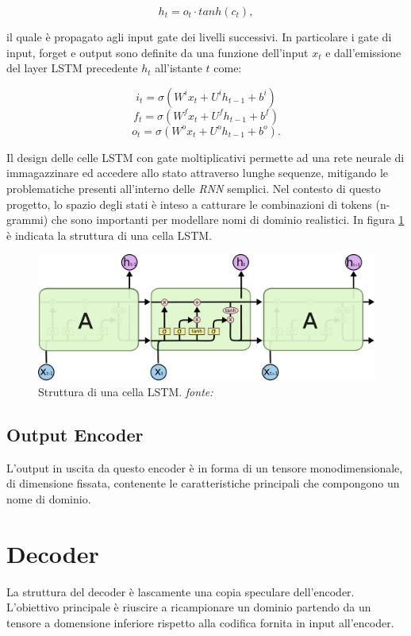 \[h_t = o_t \cdot tanh(c_t),\]

il quale è propagato agli input gate dei livelli successivi. In particolare i gate di input, forget e output sono definite da una funzione dell'input $x_t$  e dall'emissione del layer LSTM precedente $h_t$ all'istante $t$ come:

\[i_t=\sigma\left(W^ix_t+U^ih_{t-1}+b^i\right)\]
\[f_t=\sigma\left(W^fx_t+U^fh_{t-1}+b^f\right)\]
\[o_t=\sigma\left(W^ox_t+U^oh_{t-1}+b^o\right).\]


Il design delle celle LSTM con gate moltiplicativi permette ad una rete neurale di immagazzinare ed accedere allo stato attraverso lunghe sequenze, mitigando le problematiche presenti all'interno delle \textit{RNN} semplici. Nel contesto di questo progetto, lo spazio degli stati è inteso a catturare le combinazioni di tokens (n-grammi) che sono importanti per modellare nomi di dominio realistici. In figura \ref{fig:lstm} è indicata la struttura di una cella LSTM.

\begin{figure}[htb]
    \centering
	\includegraphics[width=\columnwidth]{figures/LSTM3-chain.png}
	\caption{Struttura di una cella LSTM. \textit{fonte:} \cite{lstmblog} }
\label{fig:lstm}
\end{figure}

\subsection{Output Encoder}
L'output in uscita da questo encoder è in forma di un tensore monodimensionale, di dimensione fissata, contenente le caratteristiche principali che compongono un nome di dominio.

\section{Decoder}
\label{decoder}
La struttura del decoder è lascamente una copia speculare dell'encoder. L'obiettivo principale è riuscire a ricampionare un dominio partendo da un tensore a domensione inferiore rispetto alla codifica fornita in input all'encoder.


